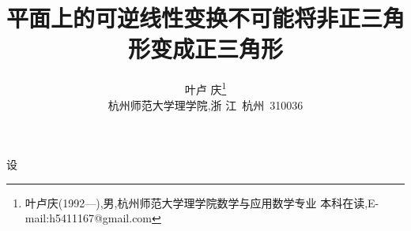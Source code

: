 \documentclass[a4paper]{article}
\begin{document}
\title{\huge{\bf{平面上的可逆线性变换不可能将非正三角形变成正三角形}}} \author{\small{叶卢
    庆\footnote{叶卢庆(1992---),男,杭州师范大学理学院数学与应用数学专业
      本科在读,E-mail:h5411167@gmail.com}}\\{\small{杭州师范大学理学院,浙
      江~杭州~310036}}}
\maketitle
设
\end{document}

